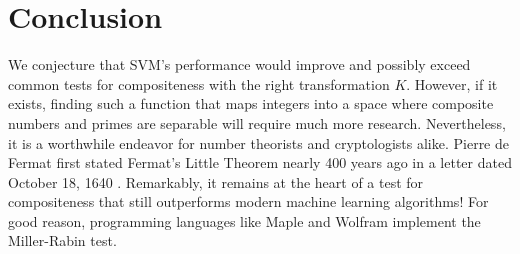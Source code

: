 \documentclass[10pt, titlepage]{amsart}
\theoremstyle{definition}
\begin{document}
	\section{Conclusion}\label{conclusions}
	We conjecture that SVM's performance would improve and possibly exceed common tests for compositeness with the right transformation $K$. 
	However, if it exists, finding such a function that maps integers into a space where composite numbers and primes are separable will require much more research.
	Nevertheless, it is a worthwhile endeavor for number theorists and cryptologists alike.  
	Pierre de Fermat first stated Fermat's Little Theorem nearly 400 years ago in a letter dated October 18, 1640 \cite{wiki:fermats_little_theorem}. 
	Remarkably, it remains at the heart of a test for compositeness that still outperforms modern machine learning algorithms! For good reason, programming languages like Maple and Wolfram implement the Miller-Rabin test.
	
	
	\clearpage
	
\end{document}

